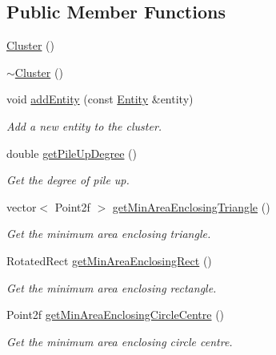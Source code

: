 \subsection*{Public Member Functions}
\begin{DoxyCompactItemize}
\item 
\hyperlink{classmultiscale_1_1analysis_1_1Cluster_aee7feb1d599d4c8fda6c3ee83e86ba81}{Cluster} ()
\item 
\hyperlink{classmultiscale_1_1analysis_1_1Cluster_a4bddfc88ac859610acab15dd12851b58}{$\sim$\-Cluster} ()
\item 
void \hyperlink{classmultiscale_1_1analysis_1_1Cluster_a2bc85629ab2bd6d01c6d2df3d79ba497}{add\-Entity} (const \hyperlink{classmultiscale_1_1analysis_1_1Entity}{Entity} \&entity)
\begin{DoxyCompactList}\small\item\em Add a new entity to the cluster. \end{DoxyCompactList}\item 
double \hyperlink{classmultiscale_1_1analysis_1_1Cluster_acff6c7308641af041598bed55005f2bf}{get\-Pile\-Up\-Degree} ()
\begin{DoxyCompactList}\small\item\em Get the degree of pile up. \end{DoxyCompactList}\item 
vector$<$ Point2f $>$ \hyperlink{classmultiscale_1_1analysis_1_1Cluster_ab28150a739c35d66874c219fd38b462b}{get\-Min\-Area\-Enclosing\-Triangle} ()
\begin{DoxyCompactList}\small\item\em Get the minimum area enclosing triangle. \end{DoxyCompactList}\item 
Rotated\-Rect \hyperlink{classmultiscale_1_1analysis_1_1Cluster_a6417e3328622a848a7dedeebb5821750}{get\-Min\-Area\-Enclosing\-Rect} ()
\begin{DoxyCompactList}\small\item\em Get the minimum area enclosing rectangle. \end{DoxyCompactList}\item 
Point2f \hyperlink{classmultiscale_1_1analysis_1_1Cluster_a4d93f85faf929336818248e1fd604fb6}{get\-Min\-Area\-Enclosing\-Circle\-Centre} ()
\begin{DoxyCompactList}\small\item\em Get the minimum area enclosing circle centre. \end{DoxyCompactList}\item 

\end{DoxyCompactItemize}
